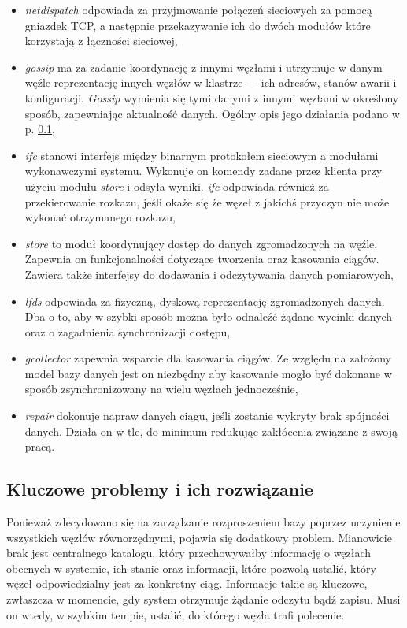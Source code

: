 \documentclass[a4paper,polish,12pt,twoside]{article}
\begin{document}
\begin{itemize}

\item \textit{netdispatch} odpowiada za przyjmowanie połączeń sieciowych za pomocą gniazdek TCP, a następnie przekazywanie ich do dwóch modułów które korzystają z łączności sieciowej,

\item \textit{gossip} ma za zadanie koordynację z innymi węzłami i utrzymuje w danym węźle reprezentację innych węzłów w klastrze --- ich adresów, stanów awarii i konfiguracji. \textit{Gossip} wymienia się tymi danymi z innymi węzłami w określony sposób, zapewniając aktualność danych. Ogólny opis jego działania podano w p. \ref{sec:keyproblems},

\item \textit{ifc} stanowi interfejs między binarnym protokołem sieciowym a modułami wykonawczymi systemu. Wykonuje on komendy zadane przez klienta przy użyciu modułu \textit{store} i odsyła wyniki. \textit{ifc} odpowiada również za przekierowanie rozkazu, jeśli okaże się że węzeł z jakichś przyczyn nie może wykonać otrzymanego rozkazu,

\item \textit{store} to moduł koordynujący dostęp do danych zgromadzonych na węźle. Zapewnia on funkcjonalności dotyczące tworzenia oraz kasowania ciągów. Zawiera także interfejsy do dodawania i odczytywania danych pomiarowych,

\item \textit{lfds} odpowiada za fizyczną, dyskową reprezentację zgromadzonych danych. Dba o to, aby w szybki sposób można było odnaleźć żądane wycinki danych oraz o zagadnienia synchronizacji dostępu,

\item \textit{gcollector} zapewnia wsparcie dla kasowania ciągów. Ze względu na założony model bazy danych jest on niezbędny aby kasowanie mogło być dokonane w sposób zsynchronizowany na wielu węzłach jednocześnie,

\item \textit{repair} dokonuje napraw danych ciągu, jeśli zostanie wykryty brak spójności danych. Działa on w tle, do minimum redukując zakłócenia związane z swoją pracą.
\end{itemize}

\subsection{Kluczowe problemy i ich rozwiązanie}
\label{sec:keyproblems}
Ponieważ zdecydowano się na zarządzanie rozproszeniem bazy poprzez uczynienie wszystkich węzłów równorzędnymi, pojawia się dodatkowy problem. Mianowicie brak jest centralnego katalogu, który przechowywałby informację o węzłach obecnych w systemie, ich stanie oraz informacji, które pozwolą ustalić, który węzeł odpowiedzialny jest za konkretny ciąg. Informacje takie są kluczowe, zwłaszcza w momencie, gdy system otrzymuje żądanie odczytu bądź zapisu. Musi on wtedy, w szybkim tempie, ustalić, do którego węzła trafi polecenie.
\end{document}
